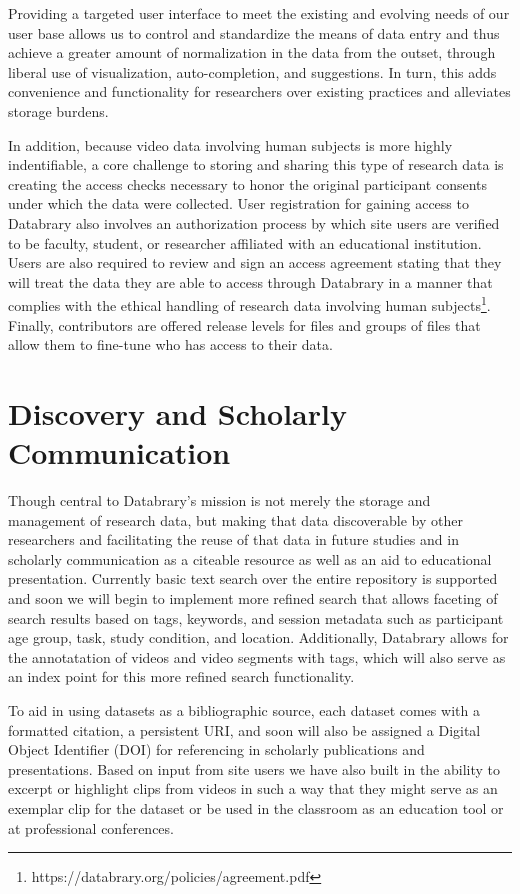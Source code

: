 \documentclass{sig-alternate}
\begin{document}
Providing a targeted user interface to meet the existing and evolving needs of our user base allows us to control and standardize the means of data entry and thus achieve a greater amount of normalization in the data from the outset, through liberal use of visualization, auto-completion, and suggestions.
In turn, this adds convenience and functionality for researchers over existing practices and alleviates storage burdens.

In addition, because video data involving human subjects is more highly indentifiable, a core challenge to storing and sharing this type of research data is creating the access checks necessary to honor the original participant consents under which the data were collected. 
User registration for gaining access to Databrary also involves an authorization process by which site users are verified to be faculty, student, or researcher affiliated with an educational institution.
Users are also required to review and sign an access agreement stating that they will treat the data they are able to access through Databrary in a manner that complies with the ethical handling of research data involving human subjects\footnote{https://databrary.org/policies/agreement.pdf}.
Finally, contributors are offered release levels for files and groups of files that allow them to fine-tune who has access to their data. 

\section{Discovery and Scholarly Communication}

Though central to Databrary's mission is not merely the storage and management of research data, but making that data discoverable by other researchers and facilitating the reuse of that data in future studies and in scholarly communication as a citeable resource as well as an aid to educational presentation.
Currently basic text search over the entire repository is supported and soon we will begin to implement more refined search that allows faceting of search results based on tags, keywords, and session metadata such as participant age group, task, study condition, and location.
Additionally, Databrary allows for the annotatation of videos and video segments with tags, which will also serve as an index point for this more refined search functionality.  

To aid in using datasets as a bibliographic source, each dataset comes with a formatted citation, a persistent URI, and soon will also be assigned a Digital Object Identifier (DOI) for referencing in scholarly publications and presentations.
Based on input from site users we have also built in the ability to excerpt or highlight clips from videos in such a way that they might serve as an exemplar clip for the dataset or be used in the classroom as an education tool or at professional conferences.
\end{document}
